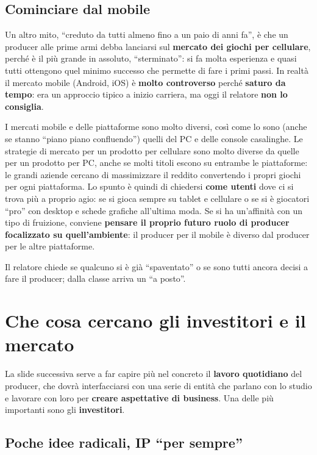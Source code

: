 \subsection{Cominciare dal mobile}

Un altro mito, ``creduto da tutti almeno fino a un paio di anni fa'', è che un
producer alle prime armi debba lanciarsi sul \textbf{mercato dei giochi per
cellulare}, perché è il più grande in assoluto, ``sterminato'': si fa molta
esperienza e quasi tutti ottengono quel minimo successo che permette di fare i
primi passi. In realtà il mercato mobile (Android, iOS) è \textbf{molto
controverso} perché \textbf{saturo da tempo}: era un approccio tipico a inizio
carriera, ma oggi il relatore \textbf{non lo consiglia}.

I mercati mobile e delle piattaforme sono molto diversi, così come lo sono
(anche se stanno ``piano piano confluendo'') quelli del PC e delle console
casalinghe. Le strategie di mercato per un prodotto per cellulare sono molto
diverse da quelle per un prodotto per PC, anche se molti titoli escono su
entrambe le piattaforme: le grandi aziende cercano di massimizzare il reddito
convertendo i propri giochi per ogni piattaforma. Lo spunto è quindi di
chiedersi \textbf{come utenti} dove ci si trova più a proprio agio: se si gioca
sempre su tablet e cellulare o se si è giocatori ``pro'' con desktop e schede
grafiche all'ultima moda. Se si ha un'affinità con un tipo di fruizione,
conviene \textbf{pensare il proprio futuro ruolo di producer focalizzato su
quell'ambiente}: il producer per il mobile è diverso dal producer per le altre
piattaforme.

Il relatore chiede se qualcuno si è già ``spaventato'' o se sono tutti ancora
decisi a fare il producer; dalla classe arriva un ``a posto''.

\section{Che cosa cercano gli investitori e il mercato}
\label{sec:z5-investitori}

La slide successiva serve a far capire più nel concreto il \textbf{lavoro
quotidiano} del producer, che dovrà interfacciarsi con una serie di entità che
parlano con lo studio e lavorare con loro per \textbf{creare aspettative di
business}. Una delle più importanti sono gli \textbf{investitori}.

\subsection{Poche idee radicali, IP ``per sempre''}

